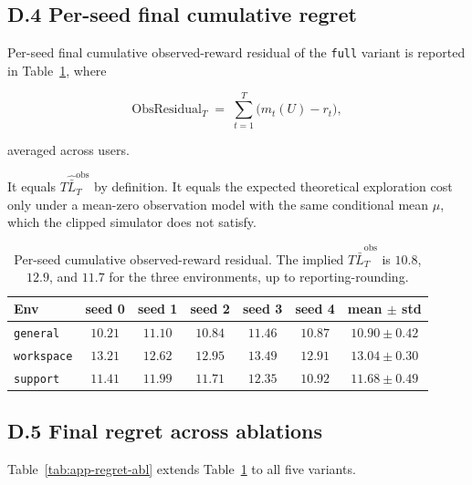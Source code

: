 \documentclass{article} %
\begin{document}
\subsection{D.4 Per-seed final cumulative regret}

\label{app:tab-regret}

Per-seed final cumulative observed-reward residual of the \texttt{full}
variant is reported in Table~\ref{tab:app-regret}, where

\begin{equation}
\label{eq:app-tab-regret}
\mathrm{ObsResidual}_T
\;=\;
\sum_{t=1}^T \big(m_t(U)-r_t\big),
\end{equation}

averaged across users.

It equals \(T\widehat{\bar L}_T^{\mathrm{obs}}\) by definition. It equals the
expected theoretical exploration cost only under a mean-zero observation model
with the same conditional mean \(\mu\), which the clipped simulator does not
satisfy.

\begin{table}[h]
\centering
\small
\begin{tabular}{lcccccc}
\toprule
Env & seed 0 & seed 1 & seed 2 & seed 3 & seed 4 & mean $\pm$ std \\
\midrule
\texttt{general}                 & $10.21$ & $11.10$ & $10.84$ & $11.46$ & $10.87$ & $10.90 \pm 0.42$ \\
\texttt{workspace}               & $13.21$ & $12.62$ & $12.95$ & $13.49$ & $12.91$ & $13.04 \pm 0.30$ \\
\texttt{support}                 & $11.41$ & $11.99$ & $11.71$ & $12.35$ & $10.92$ & $11.68 \pm 0.49$ \\
\bottomrule
\end{tabular}
\caption{Per-seed cumulative observed-reward residual. The implied
\(T\widehat{\bar L}_T^{\mathrm{obs}}\) is \(10.8\), \(12.9\), and \(11.7\)
for the three environments, up to reporting-rounding.}
\label{tab:app-regret}
\end{table}

\subsection{D.5 Final regret across ablations}

\label{app:tab-regret-ablation}

Table~\ref{tab:app-regret-abl} extends Table~\ref{tab:app-regret} to all five variants.
\end{document}
